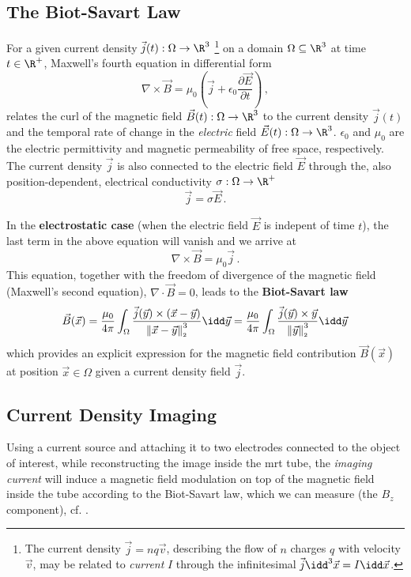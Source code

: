 \documentclass[12pt]{article}
\renewcommand{\norm}[1]{\left\lVert#1\right\rVert_{\scriptscriptstyle 2}}
\begin{document}
  \subsection{The Biot-Savart Law}
  For a given current density $\vec{j}(t): \Omega \to \R^3$ \footnote{
    The current density $\vec{j} = nq\vec{v}$, describing the flow of $n$ charges $q$ with velocity $\vec{v}$, may be related to \textit{current} $I$ through the infinitesimal $\vec{j} \idd^3\vec{x} = I \idd\vec{x}$.
  } on a domain $\Omega \subseteq \R^3$ at time $t \in \R^+$, Maxwell's fourth equation in differential form
  \begin{equation*}
    \nabla \times \vec{B} = \mu_0 \left(\vec{j} + \epsilon_0 \frac{\partial \vec{E}}{\partial t}\right)\,,
    \label{eq:maxwell-4}
  \end{equation*}
  relates the curl of the magnetic field $\vec{B}(t): \Omega \to \R^3$ to the current density $\vec{j}(t)$ and the temporal rate of change in the \textit{electric} field $\vec{E}(t): \Omega \to \R^3$.
  $\epsilon_0$ and $\mu_0$ are the electric permittivity and magnetic permeability of free space, respectively.
  The current density $\vec{j}$ is also connected to the electric field $\vec{E}$ through the, also position-dependent, electrical conductivity $\sigma: \Omega \to \R^+$
  $$\vec{j} = \sigma \vec{E}\,.$$

  In the \textbf{electrostatic case} (when the electric field $\vec{E}$ is indepent of time $t$), the last term in the above equation will vanish and we arrive at
  \begin{equation}
    \nabla \times \vec{B} = \mu_0 \vec{j}\,.
    \label{eq:maxwell-4-electrostatic}
  \end{equation}
  This equation, together with the freedom of divergence of the magnetic field (Maxwell's second equation), $\nabla \cdot \vec{B} = 0$, leads to the \textbf{Biot-Savart law}
  \begin{equation}
    \vec{B}(\vec{x})
    = \frac{\mu_0}{4\pi} \int_\Omega \frac{\vec{j}(\vec{y}) \times (\vec{x} - \vec{y})}{\norm{\vec{x} - \vec{y}}^3} \idd\vec{y}
    = \frac{\mu_0}{4\pi} \int_\Omega \frac{\vec{j}(\vec{y}) \times \vec{y}}{\norm{\vec{y}}^3} \idd\vec{y}
    \label{eq:biot-savart}
  \end{equation}
  which provides an explicit expression for the magnetic field contribution $\vec{B}(\vec{x})$ at position $\vec{x} \in \Omega$ given a current density field $\vec{j}$.

  \subsection{Current Density Imaging}
  Using a current source and attaching it to two electrodes connected to the object of interest, while reconstructing the image inside the \gls{mrt} tube, the \textit{imaging current} will induce a magnetic field modulation on top of the magnetic field inside the tube according to the Biot-Savart law, which we can measure (the $B_z$ component), cf. \cite{2004-mrcdi-from-one-var}.
\end{document}
